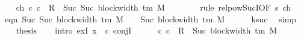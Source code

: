\begin{isabellebody}
\ \ \isamarkupfalse%
\ ch{}{}{\isacharcolon}{\kern0pt}\ {\isachardoublequoteopen}{\isacharparenleft}{\kern0pt}c{\isacharprime}{\kern0pt}{\isacharcomma}{\kern0pt}\ c{}{\isacharparenright}{\kern0pt}\ {\isasymin}\ R{\isacharprime}{\kern0pt}\ {\isacharcircum}{\kern0pt}{\isacharcircum}{\kern0pt}\ Suc\ {\isacharparenleft}{\kern0pt}Suc\ {\isacharparenleft}{\kern0pt}block{\isacharunderscore}{\kern0pt}width\ {\isacharparenleft}{\kern0pt}{\isasymGamma}{\isacharunderscore}{\kern0pt}tm\ M{\isacharparenright}{\kern0pt}\ {\isacharminus}{\kern0pt}\ {}{\isacharparenright}{\kern0pt}{\isacharparenright}{\kern0pt}{\isachardoublequoteclose}\isanewline
\ \ \ \ \isamarkupfalse%
\ {\isacharparenleft}{\kern0pt}rule\ relpow{\isacharunderscore}{\kern0pt}Suc{\isacharunderscore}{\kern0pt}I{}{\isacharbrackleft}{\kern0pt}OF\ s{}\ ch{}{}{\isacharbrackright}{\kern0pt}{\isacharparenright}{\kern0pt}\isanewline
\ \ \isamarkupfalse%
\ eqn{\isacharcolon}{\kern0pt}\ {\isachardoublequoteopen}Suc\ {\isacharparenleft}{\kern0pt}Suc\ {\isacharparenleft}{\kern0pt}block{\isacharunderscore}{\kern0pt}width\ {\isacharparenleft}{\kern0pt}{\isasymGamma}{\isacharunderscore}{\kern0pt}tm\ M{\isacharparenright}{\kern0pt}\ {\isacharminus}{\kern0pt}\ {}{\isacharparenright}{\kern0pt}{\isacharparenright}{\kern0pt}\ {\isacharequal}{\kern0pt}\ Suc\ {\isacharparenleft}{\kern0pt}block{\isacharunderscore}{\kern0pt}width\ {\isacharparenleft}{\kern0pt}{\isasymGamma}{\isacharunderscore}{\kern0pt}tm\ M{\isacharparenright}{\kern0pt}{\isacharparenright}{\kern0pt}{\isachardoublequoteclose}\isanewline
\ \ \ \ \isamarkupfalse%
\ ksuc\ \isamarkupfalse%
\ simp\isanewline
\ \ \isamarkupfalse%
\ {\isacharquery}{\kern0pt}thesis\isanewline
\ \ \isamarkupfalse%
\ {\isacharparenleft}{\kern0pt}intro\ exI{\isacharbrackleft}{\kern0pt}\ x\ {\isacharequal}{\kern0pt}\ c{}{\isacharbrackright}{\kern0pt}\ conjI{\isacharparenright}{\kern0pt}\isanewline
\ \ \ \ \isamarkupfalse%
\ {\isachardoublequoteopen}{\isacharparenleft}{\kern0pt}c{\isacharprime}{\kern0pt}{\isacharcomma}{\kern0pt}\ c{}{\isacharparenright}{\kern0pt}\ {\isasymin}\ R{\isacharprime}{\kern0pt}\ {\isacharcircum}{\kern0pt}{\isacharcircum}{\kern0pt}\ Suc\ {\isacharparenleft}{\kern0pt}block{\isacharunderscore}{\kern0pt}width\ {\isacharparenleft}{\kern0pt}{\isasymGamma}{\isacharunderscore}{\kern0pt}tm\ M{\isacharparenright}{\kern0pt}{\isacharparenright}{\kern0pt}{\isachardoublequoteclose}\isanewline

\end{isabellebody}
